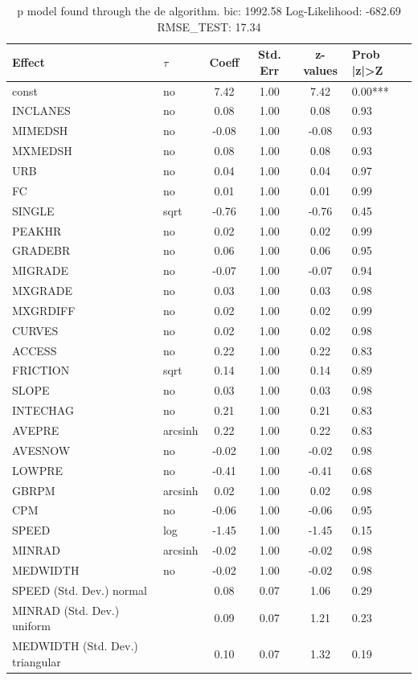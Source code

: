 \begin{table}
	\caption{p model found through the de algorithm. bic: 1992.58 Log-Likelihood: -682.69 RMSE_TEST: 17.34}
	\begin{center}
		\begin{tabular}{|l|l|c|c|c|l|}
			\hline
			Effect & $\tau$ & Coeff & Std. Err & z-values & Prob |z|>Z \\
			\hline
			const & no & 7.42 & 1.00 & 7.42 & 0.00*** \\
			\hline
			INCLANES & no & 0.08 & 1.00 & 0.08 & 0.93 \\
			\hline
			MIMEDSH & no & -0.08 & 1.00 & -0.08 & 0.93 \\
			\hline
			MXMEDSH & no & 0.08 & 1.00 & 0.08 & 0.93 \\
			\hline
			URB & no & 0.04 & 1.00 & 0.04 & 0.97 \\
			\hline
			FC & no & 0.01 & 1.00 & 0.01 & 0.99 \\
			\hline
			SINGLE & sqrt & -0.76 & 1.00 & -0.76 & 0.45 \\
			\hline
			PEAKHR & no & 0.02 & 1.00 & 0.02 & 0.99 \\
			\hline
			GRADEBR & no & 0.06 & 1.00 & 0.06 & 0.95 \\
			\hline
			MIGRADE & no & -0.07 & 1.00 & -0.07 & 0.94 \\
			\hline
			MXGRADE & no & 0.03 & 1.00 & 0.03 & 0.98 \\
			\hline
			MXGRDIFF & no & 0.02 & 1.00 & 0.02 & 0.99 \\
			\hline
			CURVES & no & 0.02 & 1.00 & 0.02 & 0.98 \\
			\hline
			ACCESS & no & 0.22 & 1.00 & 0.22 & 0.83 \\
			\hline
			FRICTION & sqrt & 0.14 & 1.00 & 0.14 & 0.89 \\
			\hline
			SLOPE & no & 0.03 & 1.00 & 0.03 & 0.98 \\
			\hline
			INTECHAG & no & 0.21 & 1.00 & 0.21 & 0.83 \\
			\hline
			AVEPRE & arcsinh & 0.22 & 1.00 & 0.22 & 0.83 \\
			\hline
			AVESNOW & no & -0.02 & 1.00 & -0.02 & 0.98 \\
			\hline
			LOWPRE & no & -0.41 & 1.00 & -0.41 & 0.68 \\
			\hline
			GBRPM & arcsinh & 0.02 & 1.00 & 0.02 & 0.98 \\
			\hline
			CPM & no & -0.06 & 1.00 & -0.06 & 0.95 \\
			\hline
			SPEED & log & -1.45 & 1.00 & -1.45 & 0.15 \\
			\hline
			MINRAD & arcsinh & -0.02 & 1.00 & -0.02 & 0.98 \\
			\hline
			MEDWIDTH & no & -0.02 & 1.00 & -0.02 & 0.98 \\
			\hline
			SPEED (Std. Dev.) normal &  & 0.08 & 0.07 & 1.06 & 0.29 \\
			\hline
			MINRAD (Std. Dev.) uniform &  & 0.09 & 0.07 & 1.21 & 0.23 \\
			\hline
			MEDWIDTH (Std. Dev.) triangular &  & 0.10 & 0.07 & 1.32 & 0.19 \\
			\hline
		\end{tabular}
	\end{center}
\end{table}